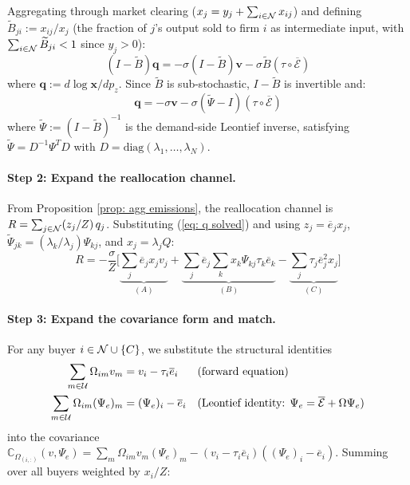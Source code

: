 Aggregating through market clearing ($x_j = y_j + \sum_{i \in \mathcal{N}} x_{ij}$) and defining $\widetilde{B}_{ji} := x_{ij}/x_j$ (the fraction of $j$'s output sold to firm $i$ as intermediate input, with $\sum_{i \in \mathcal{N}}\widetilde{B}_{ji} < 1$ since $y_j > 0$):
\begin{equation}
    \label{eq: quantity system}
    (I - \widetilde{B})\mathbf{q} = -\sigma(I - \widetilde{B})\mathbf{v} - \sigma\widetilde{B}(\tau \circ \overline{\mathcal{E}})
\end{equation}
where $\mathbf{q} := d \log \mathbf{x}/dp_z$. Since $\widetilde{B}$ is sub-stochastic, $I - \widetilde{B}$ is invertible and:
\begin{equation}
    \label{eq: q solved}
    \mathbf{q} = -\sigma\mathbf{v} - \sigma(\widetilde{\Psi} - I)(\tau \circ \overline{\mathcal{E}})
\end{equation}
where $\widetilde{\Psi} := (I - \widetilde{B})^{-1}$ is the demand-side Leontief inverse, satisfying $\widetilde{\Psi} = D^{-1}\Psi^T D$ with $D = \text{diag}(\lambda_1, \ldots, \lambda_N)$.

\paragraph{Step 2: Expand the reallocation channel.}
From Proposition \ref{prop: agg emissions}, the reallocation channel is $R = \sum_{j \in \mathcal{N}}(z_j/Z)\, q_j$. Substituting (\ref{eq: q solved}) and using $z_j = \overline{e}_j x_j$, $\widetilde{\Psi}_{jk} = (\lambda_k/\lambda_j)\Psi_{kj}$, and $x_j = \lambda_j Q$:
\begin{equation}
    \label{eq: R expanded}
    R = -\frac{\sigma}{Z}\bigg[\underbrace{\sum_j \overline{e}_j x_j v_j}_{(A)} + \underbrace{\sum_j \overline{e}_j \sum_k x_k \Psi_{kj}\tau_k\overline{e}_k}_{(B)} - \underbrace{\sum_j \tau_j \overline{e}_j^2 x_j}_{(C)}\bigg]
\end{equation}

\paragraph{Step 3: Expand the covariance form and match.}
For any buyer $i \in \mathcal{N} \cup \{C\}$, we substitute the structural identities
\begin{align*}
    \sum_{m \in \mathcal{U}} \Omega_{im} v_m &= v_i - \tau_i\overline{e}_i & &\text{(forward equation)} \\
    \sum_{m \in \mathcal{U}} \Omega_{im} (\Psi_e)_m &= (\Psi_e)_i - \overline{e}_i & &\text{(Leontief identity: } \Psi_e = \overline{\mathcal{E}} + \Omega\Psi_e\text{)}
\end{align*}
into the covariance $\mathbb{C}_{\Omega_{(i,:)}}(v, \Psi_e) = \sum_m \Omega_{im}v_m(\Psi_e)_m - (v_i - \tau_i\overline{e}_i)((\Psi_e)_i - \overline{e}_i)$. Summing over all buyers weighted by $x_i/Z$:

